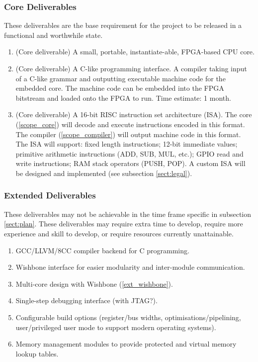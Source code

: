 \subsubsection*{Core Deliverables}
These deliverables are the base requirement for the project to be released in a functional and worthwhile state.

\begin{enumerate}[label=\bfseries C\arabic*.]
\item{(Core deliverable) A small, portable, instantiate-able, FPGA-based CPU core.}\label{scope_core}

\item{(Core deliverable) A C-like programming interface. A compiler taking input of a C-like grammar and outputting executable machine code for the embedded core. The machine code can be embedded into the FPGA bitstream and loaded onto the FPGA to run. Time estimate: 1 month.}\label{scope_compiler}

\item{(Core deliverable) A 16-bit RISC instruction set architecture (ISA). The core (\ref{scope_core}) will decode and execute instructions encoded in this format. The compiler (\ref{scope_compiler}) will output machine code in this format. The ISA will support: fixed length instructions; 12-bit immediate values; primitive arithmetic instructions (ADD, SUB, MUL, etc.); GPIO read and write instructions; RAM stack operators (PUSH, POP). A custom ISA will be designed and implemented (see subsection \ref{sect:legal}).
}
\end{enumerate}


\subsubsection*{Extended Deliverables}
These deliverables may not be achievable in the time frame specific in subsection \ref{sect:plan}. These deliverables may require extra time to develop, require more experience and skill to develop, or require resources currently unattainable.

\begin{enumerate}[label=\bfseries E\arabic*.]
\item{GCC/LLVM/8CC compiler backend for C programming.}
\item{Wishbone interface for easier modularity and inter-module communication.}\label{ext_wishbone}
\item{Multi-core design with Wishbone (\ref{ext_wishbone}).}
\item{Single-step debugging interface (with JTAG?).}
\item{Configurable build options (register/bus widths, optimisations/pipelining, user/privileged user mode to support modern operating systems).}
\item{Memory management modules to provide protected and virtual memory lookup tables.}
\end{enumerate}

